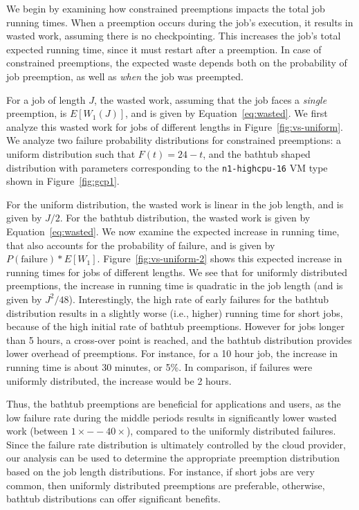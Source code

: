 \documentclass[sigconf]{acmart} %
\begin{document}
We begin by examining how constrained preemptions impacts the total job running times. 
When a preemption occurs during the job's execution, it results in wasted work, assuming there is no checkpointing. 
This increases the job's total expected running time, since it must restart after a preemption.
In case of constrained preemptions, the expected waste depends both on the probability of job preemption, as well as \emph{when} the job was preempted. 

For a job of length $J$, the wasted work, assuming that the job faces a \emph{single} preemption, is $E[W_1(J)]$, and is given by Equation~\ref{eq:wasted}.
We first analyze this wasted work for jobs of different lengths in Figure~\ref{fig:vs-uniform}. 
We analyze two failure probability distributions for constrained preemptions: a uniform distribution such that $F(t) = 24-t$, and the bathtub shaped distribution with parameters corresponding to the \texttt{n1-highcpu-16} VM type shown in Figure~\ref{fig:gcp1}. 

For the uniform distribution, the wasted work is linear in the job length, and is given by $J/2$.
For the bathtub distribution, the wasted work is given by Equation~\ref{eq:wasted}.
We now examine the expected increase in running time, that also accounts for the probability of failure, and is given by $P(\text{failure})*E[W_1]$. 
Figure~\ref{fig:vs-uniform-2} shows this expected increase in running times for jobs of different lengths.
We see that for uniformly distributed preemptions, the increase in running time is quadratic in the job length (and is given by $J^2/48$). 
Interestingly, the high rate of early failures for the bathtub distribution results in a slightly worse (i.e., higher) running time for short jobs, because of the high initial rate of bathtub preemptions. 
However for jobs longer than 5 hours, a cross-over point is reached, and the bathtub distribution provides lower overhead of preemptions.
For instance, for a 10 hour job, the increase in running time is about 30 minutes, or 5\%. 
In comparison, if failures were uniformly distributed, the increase would be 2 hours. 

Thus, the bathtub preemptions are beneficial for applications and users, as the low failure rate during the middle periods results in significantly lower wasted work (between $1\times--40\times$), compared to the uniformly distributed failures.
Since the failure rate distribution is ultimately controlled by the cloud provider, our analysis can be used to determine the appropriate preemption distribution based on the job length distributions.
For instance, if short jobs are very common, then uniformly distributed preemptions are preferable, otherwise, bathtub distributions can offer significant benefits. 
\end{document}
